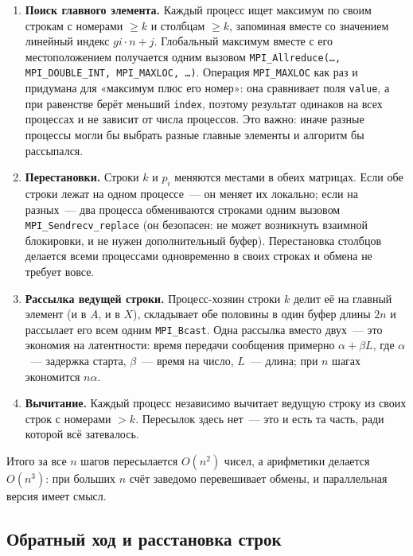 \documentclass[11pt,a4paper]{report}
\begin{document}
\begin{enumerate}[nosep]
\item \textbf{Поиск главного элемента.} Каждый процесс ищет максимум по своим
строкам с номерами $\ge k$ и столбцам $\ge k$, запоминая вместе со значением
линейный индекс $gi\cdot n+j$. Глобальный максимум вместе с его местоположением
получается одним вызовом
\texttt{MPI\_Allreduce(\dots, MPI\_DOUBLE\_INT, MPI\_MAXLOC, \dots)}.
Операция \texttt{MPI\_MAXLOC} как раз и придумана для «максимум плюс его номер»:
она сравнивает поля \texttt{value}, а при равенстве берёт меньший
\texttt{index}, поэтому результат одинаков на всех процессах и не зависит от
числа процессов. Это важно: иначе разные процессы могли бы выбрать разные
главные элементы и алгоритм бы рассыпался.

\item \textbf{Перестановки.} Строки $k$ и $p_i$ меняются местами в обеих
матрицах. Если обе строки лежат на одном процессе~--- он меняет их локально;
если на разных~--- два процесса обмениваются строками одним вызовом
\texttt{MPI\_Sendrecv\_replace} (он безопасен: не может возникнуть взаимной
блокировки, и не нужен дополнительный буфер). Перестановка столбцов делается
всеми процессами одновременно в своих строках и обмена не требует вовсе.

\item \textbf{Рассылка ведущей строки.} Процесс-хозяин строки $k$ делит её на
главный элемент (и в $A$, и в $X$), складывает обе половины в один буфер длины
$2n$ и рассылает его всем одним \texttt{MPI\_Bcast}. Одна рассылка вместо
двух~--- это экономия на латентности: время передачи сообщения примерно
$\alpha+\beta L$, где $\alpha$~--- задержка старта, $\beta$~--- время на число,
$L$~--- длина; при $n$ шагах экономится $n\alpha$.

\item \textbf{Вычитание.} Каждый процесс независимо вычитает ведущую строку из
своих строк с номерами $>k$. Пересылок здесь нет~--- это и есть та часть, ради
которой всё затевалось.
\end{enumerate}

Итого за все $n$ шагов пересылается $O(n^2)$ чисел, а арифметики делается
$O(n^3)$: при больших $n$ счёт заведомо перевешивает обмены, и параллельная
версия имеет смысл.

\subsection{Обратный ход и расстановка строк}
\end{document}
